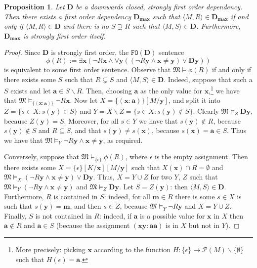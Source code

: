 \documentclass{article}
\newtheorem{Proposition}[Theorem]{Proposition}
\theoremstyle{definition}
\newcommand{\tuple}{\mathbf}
\newcommand{\FO}{\texttt{FO}}
\newcommand{\M}{\mathfrak M}
\newcommand{\D}{\mathbf D}
\newcommand{\parts}{\mathcal P}
\newcommand{\Dmax}{\mathbf D_{\textbf{max}}}
\begin{document}
\begin{Proposition}
	Let $\D$ be a downwards closed, strongly first order dependency. Then there exists a first order dependency $\Dmax$ such that $\langle M, R\rangle \in \Dmax$ if and only if $\langle M, R\rangle \in \D$ and there is no $S \supsetneq R$ such that $\langle M, S\rangle \in \D$. Furthermore, $\Dmax$ is strongly first order itself.
	\label{propo:DmaxFO}
\end{Proposition}
\begin{proof}
	Since $\D$ is strongly first order, the $\FO(\D)$ sentence 
	\[
		\phi(R) := \exists \tuple x (\lnot R \tuple x \wedge \forall \tuple y ( (\lnot R \tuple y \wedge \tuple x \not = \tuple y) \vee \D \tuple y))
	\]
	is equivalent to some first order sentence. Observe that $\M \models \phi(R)$  if and only if there exists some $S$ such that $R \subsetneq S$ and $\langle M, S\rangle \in \D$. Indeed, suppose that such a $S$ exists and let $\tuple a \in S \backslash R$. Then, choosing $\tuple a$ as the only value for $\tuple x$,\footnote{More precisely: picking $\tuple x$ according to the function $H: \{\epsilon\} \rightarrow \parts(M) \backslash \{\emptyset\}$ such that $H(\epsilon) = \tuple a$.} we have that $\M \models_{\{(\tuple x : \tuple a)\}} \lnot R \tuple x$. Now let $X = \{(\tuple x: \tuple a)\}[M/\tuple y]$, and split it into 
	$Z = \{s \in X : s(\tuple y) \in S\}$ and $Y = X \backslash Z = \{s \in X : s(\tuple y) \not \in S\}$. Clearly $\M \models_Z \D \tuple y$, because $Z(\tuple y) = S$. Moreover, for all $s \in Y$ we have that $s(\tuple y) \not \in R$, because $s(\tuple y) \not \in S$ and $R \subseteq S$, and that $s(\tuple y) \not = s(\tuple x)$, because $s(\tuple x) = \tuple a \in S$. Thus we have that $\M \models_Y \lnot R \tuple y \wedge \tuple x \not = \tuple y$, as required. 

	Conversely, suppose that $\M \models_{\{\epsilon\}}  \phi(R)$, where $\epsilon$ is the empty assignment. Then there exists some $X = \{\epsilon\}[K/\tuple x][M/\tuple y]$ such that $X(\tuple x) \cap R = \emptyset$ and $\M \models_X (\lnot R \tuple y \wedge \tuple x \not = \tuple y) \vee \D \tuple y$. Thus, $X = Y \cup Z$ for two $Y$, $Z$ such that $\M \models_Y (\lnot R \tuple y \wedge \tuple x \not = \tuple y)$ and $\M \models_Z \D \tuple y$. Let $S = Z(\tuple y)$: then $\langle M, S\rangle \in \D$. Furthermore, $R$ is contained in $S$: indeed, for all $\tuple m \in R$ there is some $s \in X$ is such that $s(\tuple y) = \tuple m$, and then $s \in Z$, because $\M \models_Y \lnot R \tuple y$ and $X = Y \cup Z$. Finally, $S$ is not contained in $R$: indeed, if $\tuple a$ is a possible value for $\tuple x$ in $X$ then $\tuple a \not \in R$ and $\tuple a \in S$ (because the assignment $(\tuple x \tuple y: \tuple a \tuple a)$ is in $X$ but not in $Y$).
%


\end{proof}
\end{document}
